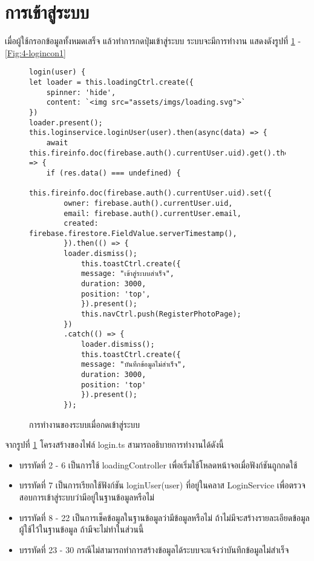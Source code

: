 \section{การเข้าสู่ระบบ}
เมื่อผู้ใช้กรอกข้อมูลทั้งหมดเสร็จ แล้วทำการกดปุ่มเข้าสู่ระบบ ระบบจะมีการทำงาน แสดงดังรูปที่ \ref{Fig:4-login} - \ref{Fig:4-logincon1}

\begin{figure}[H]
{\lstset{language=Pascal}
\begin{lstlisting}
login(user) {
let loader = this.loadingCtrl.create({
	spinner: 'hide',
	content: `<img src="assets/imgs/loading.svg">`
})
loader.present();
this.loginservice.loginUser(user).then(async(data) => {
	await this.fireinfo.doc(firebase.auth().currentUser.uid).get().then((res) => {
	if (res.data() === undefined) {
		this.fireinfo.doc(firebase.auth().currentUser.uid).set({
		owner: firebase.auth().currentUser.uid,
		email: firebase.auth().currentUser.email,
		created: firebase.firestore.FieldValue.serverTimestamp(),
		}).then(() => {
		loader.dismiss();
			this.toastCtrl.create({
			message: "เข้าสู่ระบบสำเร็จ",
			duration: 3000,
			position: 'top',
			}).present();
			this.navCtrl.push(RegisterPhotoPage);
		})
		.catch(() => {
			loader.dismiss();
			this.toastCtrl.create({
			message: "บันทึกข้อมูลไม่สำเร็จ",
			duration: 3000,
			position: 'top'
			}).present();
		});
\end{lstlisting}}
\caption{การทำงานของระบบเมื่อกดเข้าสู่ระบบ}
\label{Fig:4-login}
\end{figure}
\newpage

จากรูปที่ \ref{Fig:4-login} โครงสร้างของไฟล์ login.ts สามารถอธิบายการทำงานได้ดังนี้
\begin{itemize}[label={--}]
\item บรรทัดที่ 2 - 6 เป็นการใช้ loadingController เพื่อเริ่มใช้โหลดหน้าจอเมื่อฟังก์ชันถูกกดใช้
\item บรรทัดที่ 7 เป็นการเรียกใช้ฟังก์ชัน loginUser(user) ที่อยู่ในคลาส LoginService เพื่อตรวจสอบการเข้าสู่ระบบว่ามีอยู่ในฐานข้อมูลหรือไม่
\item บรรทัดที่ 8 - 22 เป็นการเช็คข้อมูลในฐานข้อมูลว่ามีข้อมูลหรือไม่ ถ้าไม่มีจะสร้างรายละเอียดข้อมูลผู้ใช้ไว้ในฐานข้อมูล ถ้ามีจะไม่ทำในส่วนนี้
\item บรรทัดที่ 23 - 30 กรณีไม่สามารถทำการสร้างข้อมูลได้ระบบจะแจ้งว่าบันทึกข้อมูลไม่สำเร็จ 
\end{itemize}
\newpage



